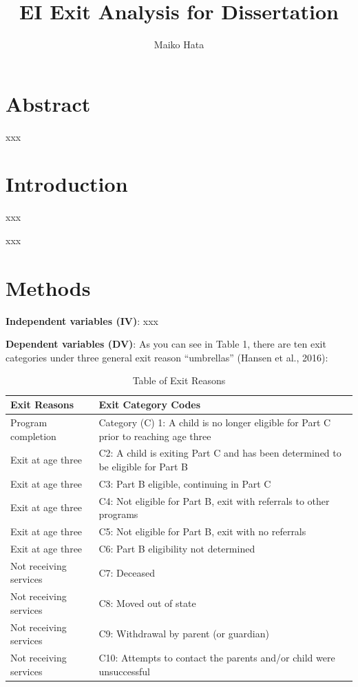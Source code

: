 \documentclass[
  letterpaper,
  DIV=11,
  numbers=noendperiod]{scrartcl}
\title{EI Exit Analysis for Dissertation}
\author{Maiko Hata}
\date{}
\begin{document}
\maketitle


\section{Abstract}\label{abstract}

xxx

\section{Introduction}\label{introduction}

xxx

xxx

\section{\texorpdfstring{\textbf{Methods}}{Methods}}\label{methods}

\textbf{Independent variables (IV)}: xxx

\textbf{Dependent variables (DV)}: As you can see in Table 1, there are
ten exit categories under three general exit reason ``umbrellas''
(Hansen et al., 2016):

\begin{longtable}[l]{ll}
\caption{Table of Exit Reasons}\\
\toprule
Exit Reasons & Exit Category Codes\\
\midrule
Program completion & Category (C) 1: A child is no longer eligible for Part C prior to reaching age three \\
Exit at age three & C2: A child is exiting Part C and has been determined to be eligible for Part B \\
Exit at age three & C3: Part B eligible, continuing in Part C  \\
Exit at age three & C4: Not eligible for Part B, exit with referrals to other programs \\
Exit at age three & C5: Not eligible for Part B, exit with no referrals \\
\addlinespace
Exit at age three & C6: Part B eligibility not determined \\
Not receiving services  & C7: Deceased\\
Not receiving services  & C8: Moved out of state \\
Not receiving services  & C9: Withdrawal by parent (or guardian) \\
Not receiving services  & C10: Attempts to contact the parents and/or child were unsuccessful \\
\bottomrule
\end{longtable}
\end{document}

